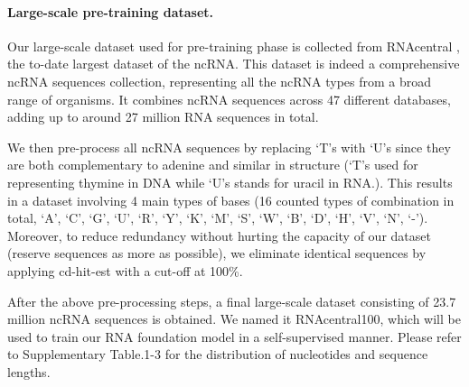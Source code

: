 \paragraph{Large-scale pre-training dataset.}

Our large-scale dataset used for pre-training phase is collected from RNAcentral \cite{rnacentral2021rnacentral}, the to-date largest dataset of the ncRNA. This dataset is indeed a comprehensive ncRNA sequences collection, representing all the ncRNA types from a broad range of organisms. It combines ncRNA sequences across 47 different databases, adding up to around 27 million RNA sequences in total.

We then pre-process all ncRNA sequences by replacing `T's with `U's since they are both complementary to adenine and similar in structure (`T's used for representing thymine in DNA while `U's stands for uracil in RNA.). This results in a dataset involving 4 main types of bases (16 counted types of combination in total, `A', `C', `G', `U', `R', `Y', `K', `M', `S', `W', `B', `D', `H', `V', `N', `-'). Moreover, to reduce redundancy without hurting the capacity of our dataset (reserve sequences as more as possible), we eliminate identical sequences by applying cd-hit-est \cite{fu2012cd} with a cut-off at 100\%.

After the above pre-processing steps, a final large-scale dataset consisting of 23.7 million ncRNA sequences is obtained. We named it RNAcentral100, which will be used to train our RNA foundation model in a self-supervised manner. Please refer to Supplementary Table.1-3 for the distribution of nucleotides and sequence lengths.


